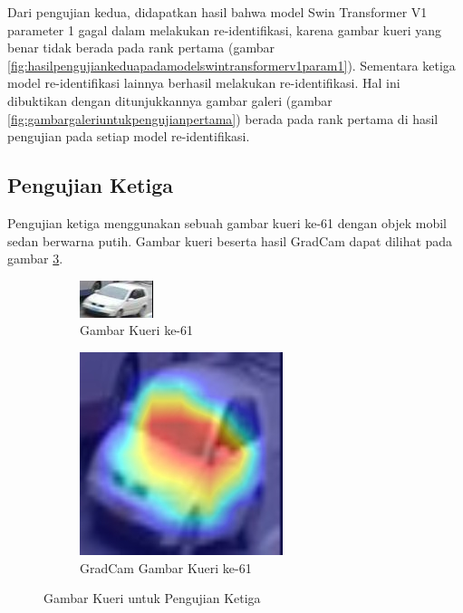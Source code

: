 Dari pengujian kedua, didapatkan hasil bahwa model Swin Transformer V1 parameter 1 gagal dalam melakukan re-identifikasi, 
karena gambar kueri yang benar tidak berada pada rank pertama (gambar 
\ref{fig:hasilpengujiankeduapadamodelswintransformerv1param1}). Sementara ketiga model re-identifikasi lainnya berhasil 
melakukan re-identifikasi. Hal ini dibuktikan dengan ditunjukkannya gambar galeri (gambar \ref{fig:gambargaleriuntukpengujianpertama})
berada pada rank pertama di hasil pengujian pada setiap model re-identifikasi.

\subsection{Pengujian Ketiga}

Pengujian ketiga menggunakan sebuah gambar kueri ke-61 dengan objek mobil sedan berwarna putih. Gambar kueri 
beserta hasil GradCam dapat dilihat pada gambar \ref{fig:gambarkueriuntukpengujianketiga}.

\begin{figure}[h!]
  \centering
  \begin{subfigure}{.5\textwidth}
    \centering
    \includegraphics[width=.4\linewidth]{gambar/Que61_1120.jpg}
    \caption{Gambar Kueri ke-61}
    \label{gambarkuerinomorenamsatu}
  \end{subfigure}%
  \begin{subfigure}{.5\textwidth}
    \centering
    \includegraphics[width=.4\linewidth]{gambar/GradCamQue61_1120.jpg}
    \caption{GradCam Gambar Kueri ke-61}
    \label{gradcamgambarkuerinomorenamsatu}
  \end{subfigure}
  \caption{Gambar Kueri untuk Pengujian Ketiga}
  \label{fig:gambarkueriuntukpengujianketiga}
\end{figure}

